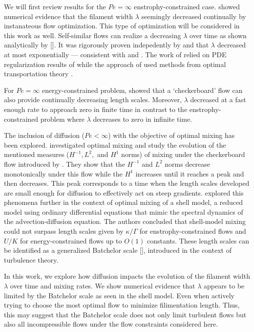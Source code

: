\documentclass{jfm}
\begin{document}
We will first review results for the $Pe = \infty$ enstrophy-constrained case. \cite{JFM2011} showed numerical evidence that the filament width $\lambda$ seemingly decreased continually by instanateous flow optimization. This type of optimization will be considered in this work as well. Self-similar flows can realize a decreasing $\lambda$ over time as shown analytically by [\cite{Alberti2014a}].  It was rigorously proven indepedently by \cite{GI2014} and \cite{CS2013} that $\lambda$ decreased at most exponentially --- consistent with \cite{JFM2011}  and \cite{Alberti2014a}. The work of \cite{GI2014} relied on PDE regularization results of \cite{Crippa} while the approach of\cite{CS2013} used methods from optimal transportation theory \cite{villani2003topics}.

For $Pe = \infty$ energy-constrained problem, \cite{JMP2012} showed that a `checkerboard' flow can also provide continually decreasing length scales. Moreover, $\lambda$ decreased at a fast enough rate to approach zero in finite time in contrast to the enstrophy-constrained problem where $\lambda$ decreases to zero in infinite time.

The inclusion of diffusion ($Pe <\infty$) with the objective of optimal mixing has been explored.  \cite{DF2014} investigated optimal mixing and study the evolution of the mentioned measures ($H^{-1}, L^2,$ and $H^1$ norms) of mixing under the checkerboard flow introduced by \cite{JMP2012}. They show that the $H^{-1}$ and $L^2$ norms decrease monotonically under this flow while the $H^{1}$ increases until it reaches a peak and then decreases. This peak corresponds to a  time when the length scales developed are small enough for diffusion to effectively act on steep gradients. \cite{Miles2017a} explored this phenomena further in the context of optimal mixing of a shell model, a reduced model using ordinary differential equations that mimic the spectral dynamics of the advection-diffusion equation. The authors concluded that shell-model mixing could not surpass length scales given by $\kappa/ \Gamma$ for enstrophy-constrained flows and $U/K$ for energy-constrained flows up to $O(1)$ constants. These length scales can be identified as a generalized Batchelor scale [\cite{Batchelor1959a}], introduced in the context of turbulence theory. 
 
 
In this work, we explore how diffusion impacts the evolution of the filament width $\lambda$ over time and mixing rates. We show numerical evidence that $\lambda$ appears to be limited by the Batchelor scale as seen in the shell model. Even when actively trying to choose the most optimal flow to minimize filimentation length. Thus, this may suggest that the Batchelor scale does not only limit turbulent flows but also all incompressible flows under the flow constraints considered here. 
\end{document}
